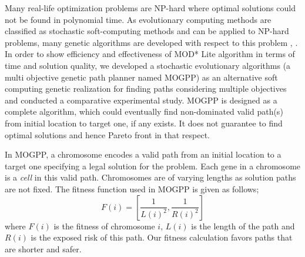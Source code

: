 \documentclass[10pt,journal]{IEEEtran}
\begin{document}
Many real-life optimization problems are NP-hard where optimal solutions could not be found in polynomial time. As evolutionary computing methods are classified as stochastic soft-computing methods and can be applied to NP-hard problems, many genetic algorithms are developed with respect to this problem \cite{Pangilinan}, \cite{Peng_Xu_Zhang:2011}. In order to show efficiency and effectiveness of MOD* Lite algorithm in terms of time and solution quality, we developed a stochastic evolutionary algorithms (a multi objective genetic path planner named MOGPP)  as an alternative soft computing genetic realization for finding paths considering multiple objectives and conducted a comparative experimental study. MOGPP is designed as a complete algorithm, which could eventually find non-dominated valid path(s) from initial location to target one, if any exists. It does not guarantee to find optimal solutions and hence Pareto front in that respect.

In MOGPP, a chromosome encodes a valid path from an initial location to a target one specifying a legal solution for the problem. Each gene in a chromosome is a \textit{cell} in this valid path. Chromosomes are of varying lengths as solution paths are not fixed. The fitness function used in MOGPP is given as follows; \[F(i) = [\dfrac{1}{L(i)^{2}}, \dfrac{1}{R(i)^{2}}] \] where $F(i)$ is the fitness of chromosome $i$, $L(i)$ is the length of the path and $R(i)$ is the exposed risk of this path.  Our fitness calculation favors paths that are shorter and safer. 
\end{document}
